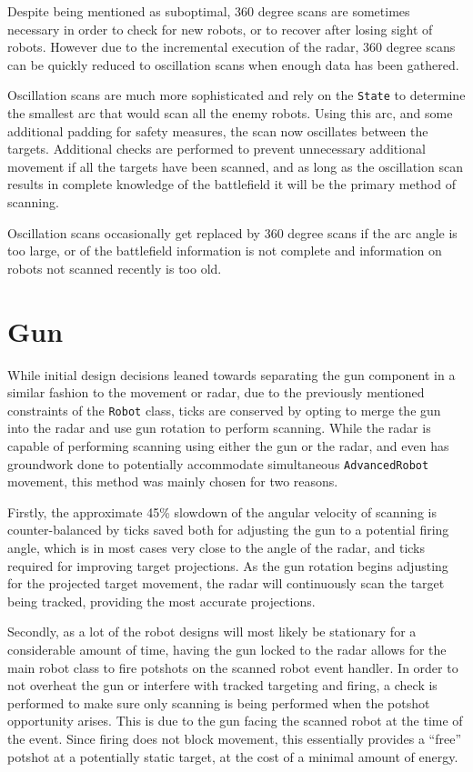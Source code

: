 \documentclass[11pt]{report}
\begin{document}
Despite being mentioned as suboptimal, 360 degree scans are sometimes necessary in order to check for new robots, or to recover after losing sight of robots. However due to the incremental execution of the radar, 360 degree scans can be quickly reduced to oscillation scans when enough data has been gathered.

Oscillation scans are much more sophisticated and rely on the \texttt{State} to determine the smallest arc that would scan all the enemy robots. Using this arc, and some additional padding for safety measures, the scan now oscillates between the targets. Additional checks are performed to prevent unnecessary additional movement if all the targets have been scanned, and as long as the oscillation scan results in complete knowledge of the battlefield it will be the primary method of scanning.

Oscillation scans occasionally get replaced by 360 degree scans if the arc angle is too large, or of the battlefield information is not complete and information on robots not scanned recently is too old.

\section{Gun}
While initial design decisions leaned towards separating the gun component in a similar fashion to the movement or radar, due to the previously mentioned constraints of the \texttt{Robot} class, ticks are conserved by opting to merge the gun into the radar and use gun rotation to perform scanning. While the radar is capable of performing scanning using either the gun or the radar, and even has groundwork done to potentially accommodate simultaneous \texttt{AdvancedRobot} movement, this method was mainly chosen for two reasons.

Firstly, the approximate 45\% slowdown of the angular velocity of scanning is counter-balanced by ticks saved both for adjusting the gun to a potential firing angle, which is in most cases very close to the angle of the radar, and ticks required for improving target projections. As the gun rotation begins adjusting for the projected target movement, the radar will continuously scan the target being tracked, providing the most accurate projections.

Secondly, as a lot of the robot designs will most likely be stationary for a considerable amount of time, having the gun locked to the radar allows for the main robot class to fire potshots on the scanned robot event handler. In order to not overheat the gun or interfere with tracked targeting and firing, a check is performed to make sure only scanning is being performed when the potshot opportunity arises. This is due to the gun facing the scanned robot at the time of the event. Since firing does not block movement, this essentially provides a ``free'' potshot at a potentially static target, at the cost of a minimal amount of energy.
\end{document}
